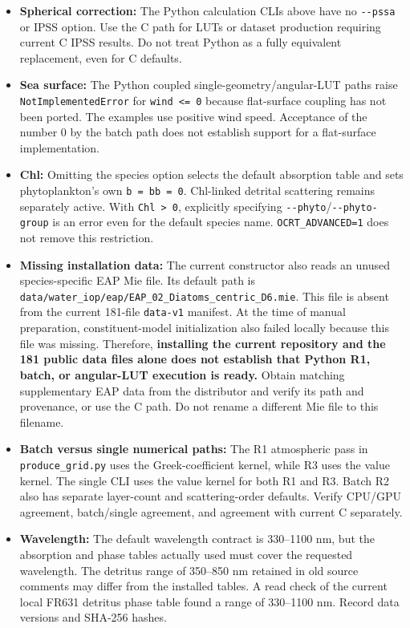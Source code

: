 \begin{itemize}
\item \textbf{Spherical correction:} The Python calculation CLIs above have no \texttt{-\allowbreak{}-\allowbreak{}pssa} or IPSS option. Use the C path for LUTs or dataset production requiring current C IPSS results. Do not treat Python as a fully equivalent replacement, even for C defaults.
\item \textbf{Sea surface:} The Python coupled single-geometry/angular-LUT paths raise \texttt{NotImplementedEr\allowbreak{}ror} for \texttt{wind <=\allowbreak{} 0} because flat-surface coupling has not been ported. The examples use positive wind speed. Acceptance of the number 0 by the batch path does not establish support for a flat-surface implementation.
\item \textbf{Chl:} Omitting the species option selects the default absorption table and sets phytoplankton's own \texttt{b =\allowbreak{} bb =\allowbreak{} 0}. Chl-linked detrital scattering remains separately active. With \texttt{Chl > 0}, explicitly specifying \texttt{-\allowbreak{}-\allowbreak{}phyto}/\texttt{-\allowbreak{}-\allowbreak{}phyto-\allowbreak{}group} is an error even for the default species name. \texttt{OCRT\_\allowbreak{}ADVANCED=\allowbreak{}1} does not remove this restriction.
\item \textbf{Missing installation data:} The current constructor also reads an unused species-specific EAP Mie file. Its default path is \texttt{data/\allowbreak{}water\_\allowbreak{}iop/\allowbreak{}eap/\allowbreak{}EAP\_\allowbreak{}02\_\allowbreak{}Diatoms\_\allowbreak{}centric\_\allowbreak{}D6.\allowbreak{}mie}. This file is absent from the current 181-file \texttt{data-\allowbreak{}v1} manifest. At the time of manual preparation, constituent-model initialization also failed locally because this file was missing. Therefore, \textbf{installing the current repository and the 181 public data files alone does not establish that Python R1, batch, or angular-LUT execution is ready.} Obtain matching supplementary EAP data from the distributor and verify its path and provenance, or use the C path. Do not rename a different Mie file to this filename.
\item \textbf{Batch versus single numerical paths:} The R1 atmospheric pass in \texttt{produce\_\allowbreak{}grid.\allowbreak{}py} uses the Greek-coefficient kernel, while R3 uses the value kernel. The single CLI uses the value kernel for both R1 and R3. Batch R2 also has separate layer-count and scattering-order defaults. Verify CPU/GPU agreement, batch/single agreement, and agreement with current C separately.
\item \textbf{Wavelength:} The default wavelength contract is 330--1100 nm, but the absorption and phase tables actually used must cover the requested wavelength. The detritus range of 350--850 nm retained in old source comments may differ from the installed tables. A read check of the current local FR631 detritus phase table found a range of 330--1100 nm. Record data versions and SHA-256 hashes.
\end{itemize}

